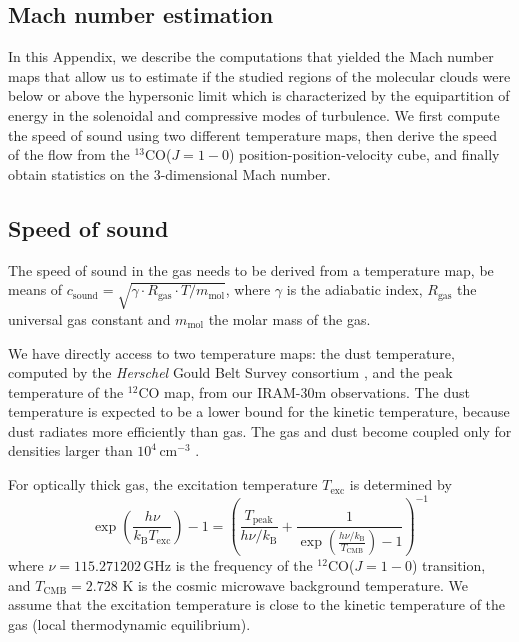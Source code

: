 \documentclass[structabstract]{aa}
\newcommand{\eg}{{\em e.g.,}}
\newcommand{\emm}[1]{\ensuremath{#1}}
\newcommand{\emr}[1]{\emm{\mathrm{#1}}}
\newcommand{\unit}[1]{\emr{\,#1}}
\newcommand{\GHz}{\unit{GHz}}
\newcommand{\pccm}{\unit{cm^{-3}}} %
\begin{document}
\begin{appendix}

\section{Mach number estimation}
In this Appendix, we describe the computations that yielded the Mach number maps that allow us to estimate if the studied regions of the molecular clouds were below or above the hypersonic limit which is characterized by the equipartition of energy in the solenoidal and compressive modes of turbulence. We first compute the speed of sound using two different temperature maps, then derive the speed of the flow from the $^{13}$CO($J=1-0$) position-position-velocity cube, and finally obtain statistics on the 3-dimensional Mach number.

\subsection{Speed of sound}
The speed of sound in the gas needs to be derived from a temperature map, be means of $c_\emr{sound} = \sqrt{\gamma\cdot R_\emr{gas}\cdot T/m_\emr{mol}}$, where $\gamma$ is the adiabatic index, $R_\emr{gas}$ the universal gas constant and $m_\emr{mol}$ the molar mass of the gas.

We have directly access to two temperature maps: the dust temperature, computed by the \emph{Herschel} Gould Belt Survey consortium \citep{schneider13}, and the peak temperature of the $^{12}$CO map, from our IRAM-30m observations. The dust temperature is expected to be a lower bound for the kinetic temperature, because dust radiates more efficiently than gas. The gas and dust become coupled only for densities larger than $10^4$\pccm{}  \citep{goldsmith01}.

For optically thick gas, the excitation temperature $T_\emr{exc}$ is determined \citep[\eg{} in][]{rohlfs04} by
\begin{equation}
\exp\left(\frac{h \nu}{k_\emr{B} T_\emr{exc}}\right) -1 = \left(\frac{T_\emr{peak}}{h\nu/k_\emr{B}} + \frac{1}{\exp\left(\frac{h \nu /k_\emr{B}}{T_\emr{CMB}}\right)-1}\right)^{-1}
\end{equation}
where $\nu = 115.271202\GHz$ is the frequency of the $^{12}$CO($J=1-0$) transition, and $T_\emr{CMB} = 2.728$ K is the cosmic microwave background temperature. We assume that the excitation temperature is close to the kinetic temperature of the gas (local thermodynamic equilibrium).


\end{appendix}
\end{document}
